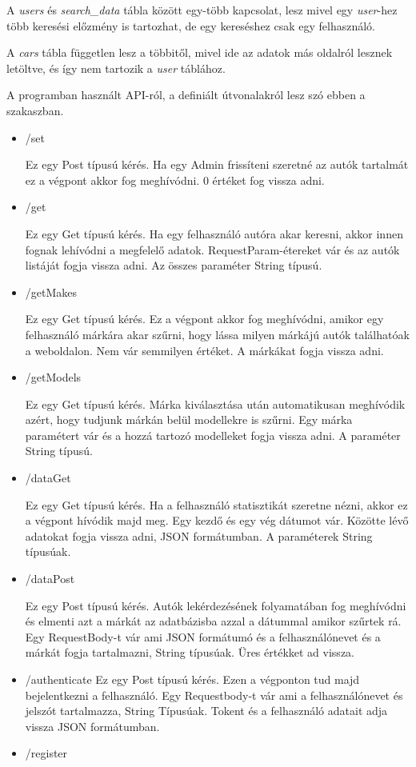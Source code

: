 A \textit{users} és \textit{search\_data} tábla között egy-több kapcsolat, lesz mivel egy \textit{user}-hez több keresési előzmény is tartozhat, de egy kereséshez csak egy felhasználó.

A \textit{cars} tábla független lesz a többitől, mivel ide az adatok más oldalról lesznek letöltve, és így nem tartozik a \textit{user} táblához.

 
A programban használt API-ról, a definiált útvonalakról lesz szó ebben a szakaszban.
\begin{itemize}
\item /set

Ez egy Post típusú kérés. Ha egy Admin frissíteni szeretné az autók tartalmát ez a végpont akkor fog meghívódni.
0 értéket fog vissza adni.
\item /get

Ez egy Get típusú kérés. Ha egy felhasználó autóra akar keresni, akkor innen fognak lehívódni a megfelelő adatok.
RequestParam-étereket vár és az autók listáját fogja vissza adni. Az összes paraméter String típusú.
\item /getMakes

Ez egy Get típusú kérés. Ez a végpont akkor fog meghívódni, amikor egy felhasználó márkára akar szűrni, hogy lássa milyen márkájú autók találhatóak a weboldalon.
Nem vár semmilyen értéket. A márkákat fogja vissza adni.
\item /getModels

Ez egy Get típusú kérés. Márka kiválasztása után automatikusan meghívódik azért, hogy tudjunk márkán belül modellekre is szűrni.
Egy márka paramétert vár és a hozzá tartozó modelleket fogja vissza adni. A paraméter String típusú.
\item /dataGet

Ez egy Get típusú kérés. Ha a felhasználó statisztikát szeretne nézni, akkor ez a végpont hívódik majd meg.
Egy kezdő és egy vég dátumot vár. Közötte lévő adatokat fogja vissza adni, JSON formátumban. A paraméterek String típusúak.
\item /dataPost

Ez egy Post típusú kérés. Autók lekérdezésének folyamatában fog meghívódni és elmenti azt a márkát az adatbázisba azzal a dátummal amikor szűrtek rá.
Egy RequestBody-t vár ami JSON formátumó és a felhasználónevet és a márkát fogja tartalmazni, String típusúak. Üres értékket ad vissza.
\item /authenticate
Ez egy Post típusú kérés. Ezen a végponton tud majd bejelentkezni a felhasználó.
Egy Requestbody-t vár ami a felhasználónevet és jelszót tartalmazza, String Típusúak. Tokent és a felhasználó adatait adja vissza JSON formátumban.
\item /register


\end{itemize}

